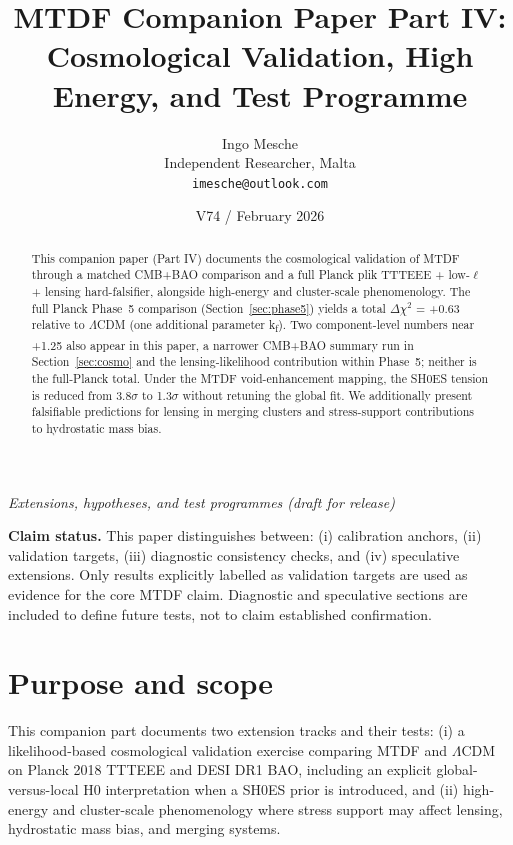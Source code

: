 \documentclass[11pt,a4paper]{article}
\title{MTDF Companion Paper Part IV: Cosmological Validation, High Energy, and Test Programme}
\author{Ingo Mesche\\ \small Independent Researcher, Malta \\ \small \texttt{imesche@outlook.com}}
\date{V74 / February 2026}
\begin{document}
\maketitle
\begin{center}\itshape Extensions, hypotheses, and test programmes (draft for release)\end{center}



\tableofcontents

\begin{abstract}
This companion paper (Part IV) documents the cosmological validation of MTDF through a matched CMB+BAO comparison and a full Planck plik TTTEEE + low-$\ell$ + lensing hard-falsifier, alongside high-energy and cluster-scale phenomenology. The full Planck Phase~5 comparison (Section~\ref{sec:phase5}) yields a total $\Delta$$\chi$$^{2}$ = +0.63 relative to $\Lambda$CDM (one additional parameter k\textsubscript{f}). Two component-level numbers near +1.25 also appear in this paper, a narrower CMB+BAO summary run in Section~\ref{sec:cosmo} and the lensing-likelihood contribution within Phase~5; neither is the full-Planck total. Under the MTDF void-enhancement mapping, the SH0ES tension is reduced from 3.8$\sigma$ to 1.3$\sigma$ without retuning the global fit. We additionally present falsifiable predictions for lensing in merging clusters and stress-support contributions to hydrostatic mass bias.
\end{abstract}

\begin{mdframed}[linecolor=accent,linewidth=0.5pt,backgroundcolor=callout-bg,leftline=true,rightline=true,topline=true,bottomline=true,innerleftmargin=8pt,innerrightmargin=8pt,innertopmargin=6pt,innerbottommargin=6pt]
\textbf{Claim status.}
This paper distinguishes between:
(i) calibration anchors,
(ii) validation targets,
(iii) diagnostic consistency checks, and
(iv) speculative extensions.
Only results explicitly labelled as validation targets are used as evidence for the core MTDF claim. Diagnostic and speculative sections are included to define future tests, not to claim established confirmation.
\end{mdframed}


\section{Purpose and scope}
\label{sec:purpose}
This companion part documents two extension tracks and their tests: (i) a likelihood-based cosmological validation exercise comparing MTDF and $\Lambda$CDM on Planck 2018 TTTEEE and DESI DR1 BAO, including an explicit global-versus-local H0 interpretation when a SH0ES prior is introduced, and (ii) high-energy and cluster-scale phenomenology where stress support may affect lensing, hydrostatic mass bias, and merging systems.
\end{document}

